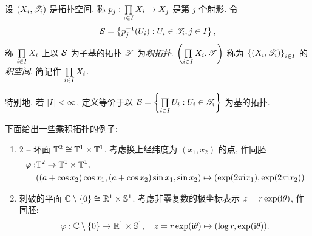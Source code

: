    \begin{Definition}[乘积拓扑]
        设 $ (X_{i}, \mathscr{T}_{i}) $ 是拓扑空间. 称 $ p_{j}:\prod\limits_{i\in I}^{}X_{i}\to X_{j} $ 是第 $ j $ 个射影. 令
        \begin{align*}
            \mathcal{S}=\left\{ p_{j}^{-1}(U_{i}): U_{i}\in\mathscr{T}_{i}, j\in I \right\},
        \end{align*}
        称 $ \prod\limits_{i\in I}^{}X_{i} $ 上以 $ \mathcal{S} $ 为子基的拓扑 $ \mathscr{T} $ 为\emph{积拓扑}. $ \left( \prod\limits_{i\in I}^{}X_{i}, \mathscr{T} \right) $ 称为 $ \left\{ (X_{i}, \mathscr{T}_{i}) \right\}_{i\in I} $ 的\emph{积空间}, 简记作 $ \prod\limits_{i\in I}^{} X_{i} $.

        特别地, 若 $ \left| I \right| <\infty $, 定义等价于以 $ \mathcal{B}=\left\{ \prod\limits_{i\in I}^{}U_{i}: U_{i}\in \mathscr{T}_{i} \right\} $ 为基的拓扑.
    \end{Definition}

    \begin{Example}
        下面给出一些乘积拓扑的例子:
        \begin{enumerate}
            \item 2 -- 环面 $ \mathbb{T}^{2}\cong \mathbb{T}^{1}\times\mathbb{T}^{1} $. 考虑换上经纬度为 $ (x_{1}, x_{2}) $ 的点, 作同胚
            \begin{align*}
                \varphi: & \mathbb{T}^{2} \to \mathbb{T}^{1}\times\mathbb{T}^{1}, \\
                & ((a+\cos x_{2})\cos x_{1}, (a+\cos x_{2})\sin x_{1}, \sin x_{2}) \mapsto (\exp(2\pi\mathrm{i} x_{1}), \exp(2\pi\mathrm{i} x_{2}))
            \end{align*}
            \item 刺破的平面 $ \mathbb{C}\setminus\left\{ 0 \right\}\cong \mathbb{R}^{1}\times\mathbb{S}^{1} $. 考虑非零复数的极坐标表示 $ z=r\exp(\mathrm{i}\theta) $, 作同胚:
            \begin{align*}
                \varphi: \mathbb{C}\setminus \left\{ 0 \right\}\to \mathbb{R}^{1}\times \mathbb{S}^{1}, \quad z=r\exp(\mathrm{i}\theta)\mapsto(\log r, \exp(\mathrm{i}\theta)).
            \end{align*}
        \end{enumerate}
    \end{Example}

